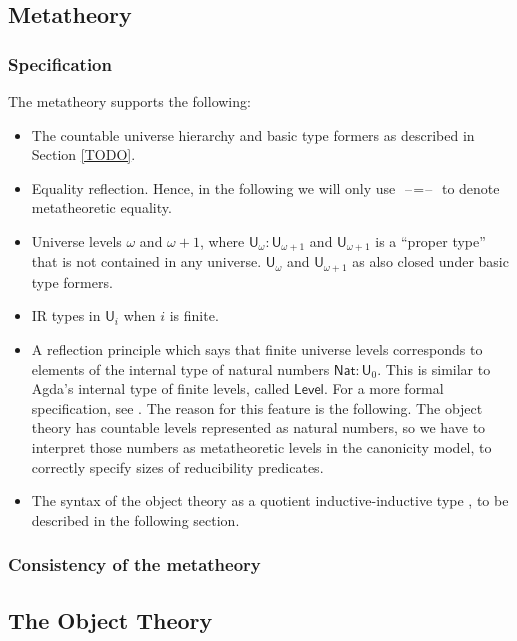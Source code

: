\documentclass[acmsmall,screen,review,anonymous]{acmart}
\newcommand{\msf}[1]{{\mathsf{#1}}}
\newcommand{\U}{\msf{U}}
\newcommand{\Nat}{\msf{Nat}}
\newcommand{\blank}{{\mathord{\hspace{1pt}\text{--}\hspace{1pt}}}}
\newcommand{\Level}{\msf{Level}}
\begin{document}
\subsection{Metatheory}\label{sec:metatheory}

\subsubsection{Specification} The metatheory supports the following:
\begin{itemize}
  \item The countable universe hierarchy and basic type formers as described in Section \ref{TODO}.
  \item Equality reflection. Hence, in the following we will only use $\blank\!=\!\blank$ to denote
    metatheoretic equality.
  \item Universe levels $\omega$ and $\omega+1$, where $\U_\omega : \U_{\omega + 1}$ and $\U_{\omega + 1}$
        is a ``proper type'' that is not contained in any universe. $\U_\omega$ and $\U_{\omega + 1}$ as
        also closed under basic type formers.
  \item IR types in $\U_i$ when $i$ is finite.
  \item A reflection principle which says that finite universe levels corresponds to elements of the
    internal type of natural numbers $\Nat : \U_0$. This is similar to Agda's internal type of
    finite levels, called $\Level$.  For a more formal specification, see \cite{TODO}. The reason
    for this feature is the following. The object theory has countable levels represented
    as natural numbers, so we have to interpret those numbers as metatheoretic levels in the
    canonicity model, to correctly specify sizes of reducibility predicates.
  \item The syntax of the object theory as a quotient inductive-inductive type \cite{TODO}, to be
    described in the following section.
\end{itemize}

\subsubsection{Consistency of the metatheory}


\subsection{The Object Theory}\label{sec:object-theory}
\end{document}
